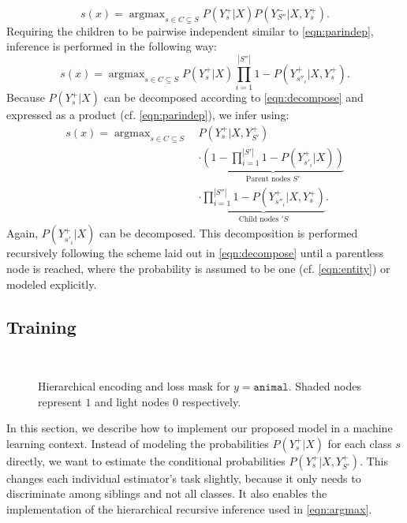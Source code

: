 \documentclass[10pt,twocolumn,letterpaper]{article}
\DeclareMathOperator*{\argmax}{argmax}
\begin{document}
\begin{equation}
    s(x) = \argmax_{s \in C \subseteq S}{P(Y_s^+|X)}P(Y_{S''}^-|X,Y_s^+). %
\end{equation}
Requiring the children to
be pairwise independent similar to \cref{eqn:parindep}, inference is performed in the following way:
\begin{equation}
   s(x) =  \argmax_{s \in C \subseteq S}{P(Y_s^+|X)\prod_{i=1}^{|S''|}{1-P(Y_{s''_i}^+|X,Y_s^+)}}.
\end{equation}
Because $P(Y_s^+|X)$ can be decomposed according to \cref{eqn:decompose} and expressed as a product (cf. \cref{eqn:parindep}),
we infer using:
\begin{equation}
  \begin{split}
   s(x) = \argmax_{s \in C \subseteq S}\,&
   P(Y_s^+|X, Y_{S'}^+)\\
   &\cdot \underbrace{(1 - \prod_{i=1}^{|S'|}{1-P(Y_{s'_i}^+|X)})}_{\text{Parent nodes }S'}\\
   &\cdot \underbrace{\prod_{i=1}^{|S''|}{1-P(Y_{s''_i}^+|X,Y_s^+)}}_{\text{Child nodes }'S}.
   \label{eqn:argmax}
  \end{split}
\end{equation}
Again, $P(Y_{s'_i}^+|X)$ can be decomposed. This decomposition is performed recursively
following the scheme laid out in \cref{eqn:decompose} until a parentless node is reached,
where the probability is assumed to be one (cf. \cref{eqn:entity}) or modeled explicitly.

\subsection{Training}
\label{sec:loss}
\begin{figure}[t]
  \begin{center}
  \\
  \caption{Hierarchical encoding and loss mask for $y=\texttt{animal}$. Shaded
  nodes represent $1$ and light nodes $0$ respectively.}
  \label{fig:henc}
  \end{center}
\end{figure}
In this section, we describe how to implement our proposed model in a machine learning context.
Instead of modeling the probabilities $P(Y_s^+|X)$ for each class $s$ directly, we want to estimate
the conditional probabilities $P(Y_s^+|X, Y_{S'}^+)$. This changes each individual estimator's task
slightly, because it only needs to discriminate among siblings and not all classes. It also enables the implementation of
the hierarchical recursive inference used in \cref{eqn:argmax}.
\end{document}

